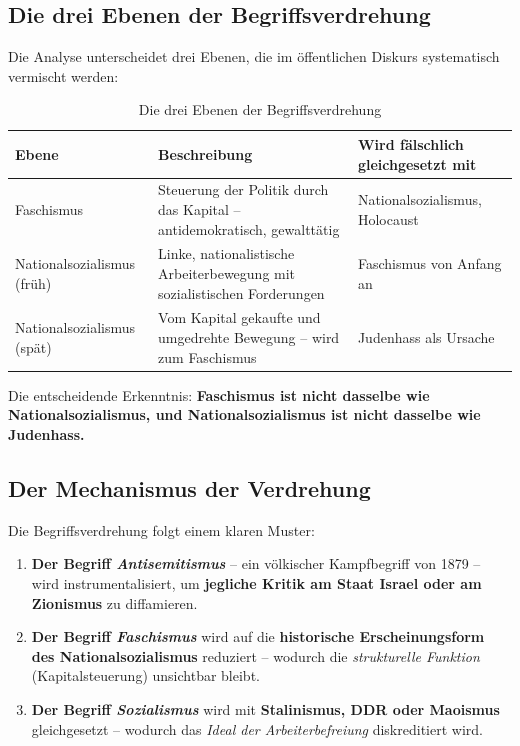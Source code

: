 \subsection{Die drei Ebenen der Begriffsverdrehung}

Die Analyse unterscheidet drei Ebenen, die im öffentlichen Diskurs systematisch vermischt werden:

\begin{table}[ht]
\centering
\begin{tabular}{|p{}|p{}|p{}|}
\hline
\textbf{Ebene} & \textbf{Beschreibung} & \textbf{Wird fälschlich gleichgesetzt mit} \\
\hline
Faschismus & Steuerung der Politik durch das Kapital -- antidemokratisch, gewalttätig & Nationalsozialismus, Holocaust \\
\hline
Nationalsozialismus (früh) & Linke, nationalistische Arbeiterbewegung mit sozialistischen Forderungen & Faschismus von Anfang an \\
\hline
Nationalsozialismus (spät) & Vom Kapital gekaufte und umgedrehte Bewegung -- wird zum Faschismus & Judenhass als Ursache \\
\hline
\end{tabular}
\caption{Die drei Ebenen der Begriffsverdrehung}
\end{table}

Die entscheidende Erkenntnis: \textbf{Faschismus ist nicht dasselbe wie Nationalsozialismus, und Nationalsozialismus ist nicht dasselbe wie Judenhass.}

\subsection{Der Mechanismus der Verdrehung}

Die Begriffsverdrehung folgt einem klaren Muster:

\begin{enumerate}
    \item \textbf{Der Begriff \emph{Antisemitismus}} -- ein völkischer Kampfbegriff von 1879 -- wird instrumentalisiert, um \textbf{jegliche Kritik am Staat Israel oder am Zionismus} zu diffamieren.
    
    \item \textbf{Der Begriff \emph{Faschismus}} wird auf die \textbf{historische Erscheinungsform des Nationalsozialismus} reduziert -- wodurch die \emph{strukturelle Funktion} (Kapitalsteuerung) unsichtbar bleibt.
    
    \item \textbf{Der Begriff \emph{Sozialismus}} wird mit \textbf{Stalinismus, DDR oder Maoismus} gleichgesetzt -- wodurch das \emph{Ideal der Arbeiterbefreiung} diskreditiert wird.
\end{enumerate}

